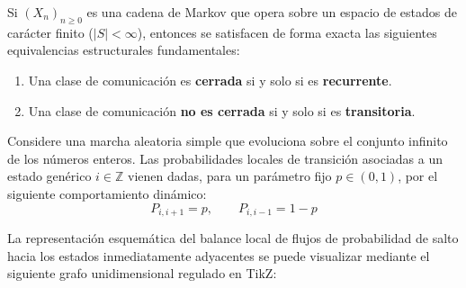 \begin{teo}
\end{teo}

\begin{coro}
    Si $(X_n)_{n \geq 0}$ es una cadena de Markov que opera sobre un espacio de estados de carácter finito ($|S| < \infty$), entonces se satisfacen de forma exacta las siguientes equivalencias estructurales fundamentales:
    \begin{enumerate}
        \item Una clase de comunicación es \textbf{cerrada} si y solo si es \textbf{recurrente}.
        \item Una clase de comunicación \textbf{no es cerrada} si y solo si es \textbf{transitoria}.
    \end{enumerate}
\end{coro}


\begin{ejemplo}
Considere una marcha aleatoria simple que evoluciona sobre el conjunto infinito de los números enteros. Las probabilidades locales de transición asociadas a un estado genérico $i \in \mathbb{Z}$ vienen dadas, para un parámetro fijo $p \in (0,1)$, por el siguiente comportamiento dinámico:
\[ 
P_{i, i+1} = p, \qquad P_{i, i-1} = 1 - p 
\]

La representación esquemática del balance local de flujos de probabilidad de salto hacia los estados inmediatamente adyacentes se puede visualizar mediante el siguiente grafo unidimensional regulado en TikZ:

\begin{center}
\end{center}
\end{ejemplo}

